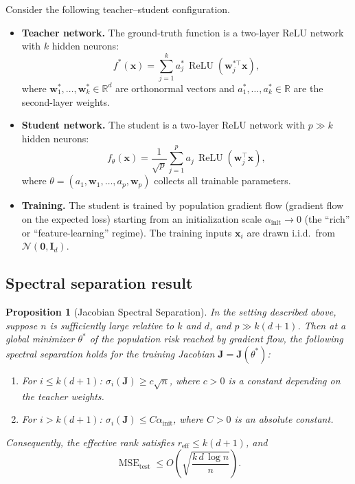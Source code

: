 \documentclass[12pt]{amsart}
\newtheorem{proposition}[theorem]{Proposition}
\theoremstyle{definition}
\theoremstyle{remark}
\DeclareMathOperator{\MSE}{MSE}
\DeclareMathOperator{\relu}{ReLU}
\newcommand{\R}{\mathbb{R}}
\newcommand{\bx}{\mathbf{x}}
\newcommand{\bJ}{\mathbf{J}}
\newcommand{\bI}{\mathbf{I}}
\newcommand{\bw}{\mathbf{w}}
\begin{document}
Consider the following teacher--student configuration.

\begin{itemize}
  \item \textbf{Teacher network.}  The ground-truth function is a two-layer
    ReLU network with $k$ hidden neurons:
    \begin{equation}\label{eq:teacher}
      f^{*}(\bx) = \sum_{j=1}^{k} a_{j}^{*}\,\relu(\bw_{j}^{*\top}\bx),
    \end{equation}
    where $\bw_{1}^{*}, \ldots, \bw_{k}^{*} \in \R^{d}$ are orthonormal vectors
    and $a_{1}^{*}, \ldots, a_{k}^{*} \in \R$ are the second-layer weights.

  \item \textbf{Student network.}  The student is a two-layer ReLU network with
    $p \gg k$ hidden neurons:
    \begin{equation}\label{eq:student}
      f_{\theta}(\bx) = \frac{1}{\sqrt{p}}
        \sum_{j=1}^{p} a_{j}\,\relu(\bw_{j}^{\top}\bx),
    \end{equation}
    where $\theta = (a_{1}, \bw_{1}, \ldots, a_{p}, \bw_{p})$ collects all
    trainable parameters.

  \item \textbf{Training.}  The student is trained by population gradient flow
    (gradient flow on the expected loss) starting from an initialization scale
    $\alpha_{\mathrm{init}} \to 0$ (the ``rich'' or ``feature-learning'' regime).
    The training inputs $\bx_{i}$ are drawn i.i.d.\ from $\mathcal{N}(\mathbf{0}, \bI_{d})$.
\end{itemize}

\subsection{Spectral separation result}

\begin{proposition}[Jacobian Spectral Separation]\label{prop:teacher-student}
In the setting described above, suppose $n$ is sufficiently large relative to
$k$ and $d$, and $p \gg k(d+1)$.  Then at a global minimizer $\theta^{*}$ of the
population risk reached by gradient flow, the following spectral separation holds
for the training Jacobian $\bJ = \bJ(\theta^{*})$:
\begin{enumerate}
  \item For $i \leq k(d+1)$: $\sigma_{i}(\bJ) \geq c\sqrt{n}$, where $c > 0$
    is a constant depending on the teacher weights.
  \item For $i > k(d+1)$: $\sigma_{i}(\bJ) \leq C\alpha_{\mathrm{init}}$,
    where $C > 0$ is an absolute constant.
\end{enumerate}
Consequently, the effective rank satisfies $r_{\mathrm{eff}} \leq k(d+1)$, and
\begin{equation}\label{eq:gen-bound-ts}
  \MSE_{\mathrm{test}}
  \leq O\!\left(\sqrt{\frac{k\,d\,\log n}{n}}\right).
\end{equation}
\end{proposition}
\end{document}
